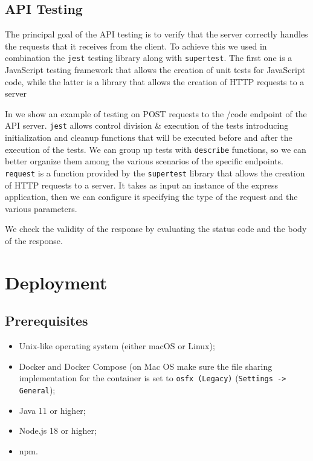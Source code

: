 \documentclass{scrartcl}
\begin{document}
\subsection{API Testing}
The principal goal of the API testing is to verify that the server correctly handles the requests that it receives from the client. To achieve this we used in combination the \texttt{jest} testing library along with \texttt{supertest}. The first one is a JavaScript testing framework that allows the creation of unit tests for JavaScript code, while the latter is a library that allows the creation of HTTP requests to a server


In  we show an example of testing on POST requests to the /code endpoint of the API server. \texttt {jest} allows control division \& execution of the tests introducing initialization and cleanup functions that will be executed before and after the execution of the tests. 
We can group up tests with \texttt{describe} functions, so we can better organize them among the various scenarios of the specific endpoints.
\texttt{request} is a function provided by the \texttt{supertest} library that allows the creation of HTTP requests to a server. It takes as input an instance of the express application, then we can configure it specifying the type of the request and the various parameters.

We check the validity of the response by evaluating the status code and the body of the response. 

\fi

\section{Deployment}


\subsection{Prerequisites}

\begin{itemize}
    \item Unix-like operating system (either macOS or Linux);
    \item Docker and Docker Compose (on Mac OS make sure the file sharing implementation for the container is set to \texttt{osfx (Legacy)} (\texttt{Settings -> General});
    \item Java 11 or higher;
    \item Node.js 18 or higher;
    \item npm.
\end{itemize}
\end{document}
